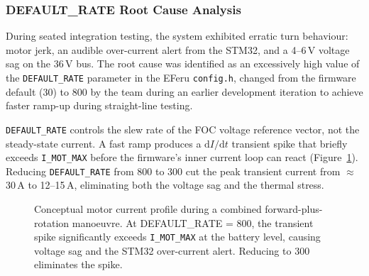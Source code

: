 \documentclass[12pt,a4paper]{report}
\begin{document}
\subsubsection{DEFAULT\_RATE Root Cause Analysis}
\label{subsec:default_rate_rca_impl}

During seated integration testing, the system exhibited erratic turn behaviour:
motor jerk, an audible over-current alert from the STM32, and a 4–6\,V
voltage sag on the 36\,V bus. The root cause was identified as an excessively
high value of the \texttt{DEFAULT\_RATE} parameter in the EFeru
\texttt{config.h}, changed from the firmware default (30) to 800 by the team
during an earlier development iteration to achieve faster ramp-up during
straight-line testing.

\texttt{DEFAULT\_RATE} controls the slew rate of the FOC voltage reference
vector, not the steady-state current. A fast ramp produces a
$\mathrm{d}I/\mathrm{d}t$ transient spike that briefly exceeds
\texttt{I\_MOT\_MAX} before the firmware's inner current loop can react
(Figure~\ref{fig:current_ramp_impl}). Reducing \texttt{DEFAULT\_RATE} from 800
to 300 cut the peak transient current from $\approx$30\,A to 12–15\,A,
eliminating both the voltage sag and the thermal stress.

\begin{figure}[H]
\centering
{}
\caption{Conceptual motor current profile during a combined
  forward-plus-rotation manoeuvre. At DEFAULT\_RATE = 800, the transient
  spike significantly exceeds \texttt{I\_MOT\_MAX} at the battery level,
  causing voltage sag and the STM32 over-current alert. Reducing to 300
  eliminates the spike.}
\label{fig:current_ramp_impl}
\end{figure}
\end{document}
